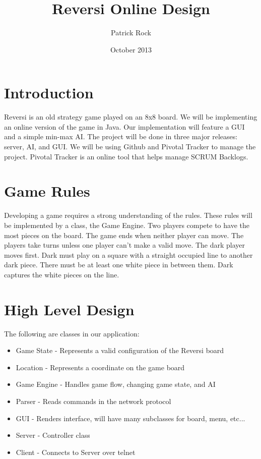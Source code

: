 \documentclass{article}
\title{Reversi Online Design}
\author{Patrick Rock}
\date{October 2013}
\begin{document}
\maketitle

\section{Introduction}
Reversi is an old strategy game played on an 8x8 board. We will be implementing
an online version of the game in Java. Our implementation will feature a GUI and a simple
min-max AI. The project will be done in three major releases: server, AI, and GUI.
We will be using Github and Pivotal Tracker to manage the project. Pivotal Tracker
is an online tool that helps manage SCRUM Backlogs.

\section{Game Rules}
Developing a game requires a strong understanding of the rules. These rules will
be implemented by a class, the Game Engine.
Two players compete to have the most pieces on the board. 
The game ends when neither player can move.
The players take turns unless one player can't make a valid move. 
The dark player moves first.
Dark must play on a square with a straight occupied line to another dark piece. There 
must be at least one white piece in between them. Dark captures the white pieces
on the line.

\section{High Level Design}
The following are classes in our application:
\begin{itemize}
\item Game State   - Represents a valid configuration of the Reversi board
\item Location     - Represents a coordinate on the game board
\item Game Engine  - Handles game flow, changing game state, and AI
\item Parser       - Reads commands in the network protocol 
\item GUI          - Renders interface, will have many subclasses for board, menu, etc...
\item Server       - Controller class
\item Client       - Connects to Server over telnet
\end{itemize}
\end{document}
